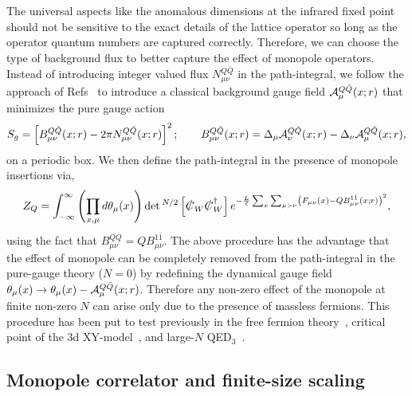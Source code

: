 \documentclass[prd, onecolumn, superscriptaddress, nofootinbib, notitlepage, floatfix]{revtex4-1}
\newcommand\beq{\begin{equation}}
\newcommand\eeq[1]{\label{#1}\end{equation}}
\begin{document}
The universal aspects like the anomalous dimensions at the infrared
fixed point should not be sensitive to the exact details of the lattice operator
so long as the operator quantum numbers are captured correctly. Therefore, we
can choose the type of background flux to better capture the effect
of monopole operators.  Instead of introducing integer valued flux
$N^{Q\bar Q}_{\mu\nu}$ in the path-integral, we follow the approach
of Refs~\cite{Murthy:1989ps,Pufu:2013eda} to introduce a classical background gauge field
${\cal A}^{Q\bar Q}_{\mu}(x;r)$ that minimizes the pure gauge action
\beq
S_g = \left[ B_{\mu\nu}^{Q\bar Q}(x;r) - 2\pi N^{Q\bar Q}_{\mu\nu}(x;r)\right]^2; \qquad B_{\mu\nu}^{Q\bar Q}(x;r) = \Delta_\mu {\cal A}^{Q\bar Q}_{\nu}(x;r) - \Delta_\nu {\cal A}^{Q\bar Q}_{\mu}(x;r),
\eeq{bmunu}
on a periodic box.
We then define the path-integral in the presence of monopole insertions via,
\beq
Z_Q = \int_{-\infty}^\infty \left(\prod_{x,\mu} d\theta_\mu(x)\right) \det{}^{N/2}\left[\slashed{C}_W\slashed{C}_W^\dagger\right] e^{-\frac{L}{\ell} \sum_{x}\sum_{\mu>\nu}\left(F_{\mu\nu}(x)- Q B^{1\bar 1}_{\mu\nu}(x;r)\right)^2},
\eeq{normalpathQ}
using the fact that $B_{\mu\nu}^{Q\bar Q} = Q B_{\mu\nu}^{1\bar
1}$.  The above procedure has the advantage that the effect of
monopole can be completely removed from the path-integral in the
pure-gauge theory ($N=0$) by redefining the dynamical gauge field
$\theta_\mu(x) \to \theta_\mu(x) - {\cal A}^{Q\bar Q}_\mu(x;r)$.
Therefore any non-zero effect of the monopole at finite non-zero
$N$ can arise only due to the presence of massless fermions.  This
procedure has been put to test previously in the free fermion
theory~\cite{Karthik:2018rcg}, critical point of the 3d
XY-model~\cite{Karthik:2018rcg}, and large-$N$
QED$_3$~\cite{Karthik:2019mrr}.

\subsection{Monopole correlator and finite-size scaling}
\end{document}
